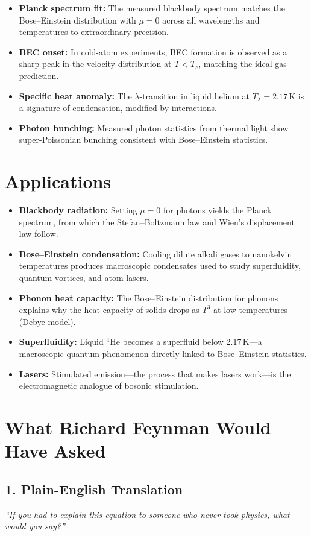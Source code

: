 \documentclass[11pt,openright]{book}
\begin{document}
\begin{itemize}
\item \textbf{Planck spectrum fit:} The measured blackbody spectrum matches the Bose--Einstein distribution with $\mu = 0$ across all wavelengths and temperatures to extraordinary precision.
\item \textbf{BEC onset:} In cold-atom experiments, BEC formation is observed as a sharp peak in the velocity distribution at $T < T_c$, matching the ideal-gas prediction.
\item \textbf{Specific heat anomaly:} The $\lambda$-transition in liquid helium at $T_\lambda = 2.17$\,K is a signature of condensation, modified by interactions.
\item \textbf{Photon bunching:} Measured photon statistics from thermal light show super-Poissonian bunching consistent with Bose--Einstein statistics.
\end{itemize}
\section*{Applications}

\begin{itemize}
\item \textbf{Blackbody radiation:} Setting $\mu = 0$ for photons yields the Planck spectrum, from which the Stefan--Boltzmann law and Wien's displacement law follow.
\item \textbf{Bose--Einstein condensation:} Cooling dilute alkali gases to nanokelvin temperatures produces macroscopic condensates used to study superfluidity, quantum vortices, and atom lasers.
\item \textbf{Phonon heat capacity:} The Bose--Einstein distribution for phonons explains why the heat capacity of solids drops as $T^3$ at low temperatures (Debye model).
\item \textbf{Superfluidity:} Liquid $^4$He becomes a superfluid below 2.17\,K---a macroscopic quantum phenomenon directly linked to Bose--Einstein statistics.
\item \textbf{Lasers:} Stimulated emission---the process that makes lasers work---is the electromagnetic analogue of bosonic stimulation.
\end{itemize}
\section*{What Richard Feynman Would Have Asked}

\subsection*{1. Plain-English Translation}
\textit{``If you had to explain this equation to someone who never took physics, what would you say?''}
\end{document}
